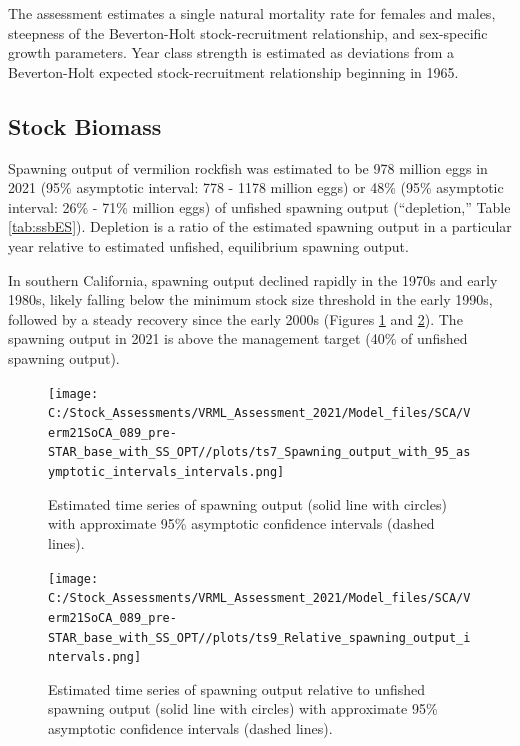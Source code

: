 \documentclass[11pt,
  english,
  a4paper,
]{article}
\begin{document}
The assessment estimates a single natural mortality rate for females and males, steepness of the Beverton-Holt stock-recruitment relationship, and sex-specific growth parameters. Year class strength is estimated as deviations from a Beverton-Holt expected stock-recruitment relationship beginning in 1965.

\FloatBarrier


\hypertarget{stock-biomass}{%
\subsection*{Stock Biomass}\label{stock-biomass}}

\leavevmode\tagmcend\tagstructend

Spawning output of vermilion rockfish was estimated to be 978 million eggs in 2021 (95\% asymptotic interval: 778 - 1178 million eggs) or 48\% (95\% asymptotic interval: 26\% - 71\% million eggs) of unfished spawning output (``depletion,'' Table \ref{tab:ssbES}). Depletion is a ratio of the estimated spawning output in a particular year relative to estimated unfished, equilibrium spawning output.

In southern California, spawning output declined rapidly in the 1970s and early 1980s, likely falling below the minimum stock size threshold in the early 1990s, followed by a steady recovery since the early 2000s (Figures \ref{fig:ssbES} and \ref{fig:deplES}). The spawning output in 2021 is above the management target (40\% of unfished spawning output).

\begin{figure}
\centering
\texttt{[image: C:/Stock\_Assessments/VRML\_Assessment\_2021/Model\_files/SCA/Verm21SoCA\_089\_pre-STAR\_base\_with\_SS\_OPT//plots/ts7\_Spawning\_output\_with\_95\_asymptotic\_intervals\_intervals.png]}
\caption{Estimated time series of spawning output (solid line with circles) with approximate 95\% asymptotic confidence intervals (dashed lines).\label{fig:ssbES}}
\end{figure}

\begin{figure}
\centering
\texttt{[image: C:/Stock\_Assessments/VRML\_Assessment\_2021/Model\_files/SCA/Verm21SoCA\_089\_pre-STAR\_base\_with\_SS\_OPT//plots/ts9\_Relative\_spawning\_output\_intervals.png]}
\caption{Estimated time series of spawning output relative to unfished spawning output (solid line with circles) with approximate 95\% asymptotic confidence intervals (dashed lines).\label{fig:deplES}}
\end{figure}
\end{document}
